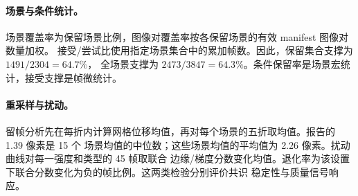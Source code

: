 \paragraph{场景与条件统计。}
场景覆盖率为保留场景比例，图像对覆盖率按各保留场景的有效 manifest 图像对数量加权。
接受/尝试比使用指定场景集合中的累加帧数。因此，保留集合支撑为 $1491/2304=64.7\%$，
全场景支撑为 $2473/3847=64.3\%$。条件保留率是场景宏统计，接受支撑是帧微统计。

\paragraph{重采样与扰动。}
留帧分析先在每折内计算网格位移均值，再对每个场景的五折取均值。报告的 1.39 像素是 15 个
场景均值的中位数；这些场景均值的平均值为 2.26 像素。扰动曲线对每一强度和类型的 45 帧取联合
边缘/梯度分数变化均值。退化率为该设置下联合分数变化为负的帧比例。这两类检验分别评价共识
稳定性与质量信号响应。
